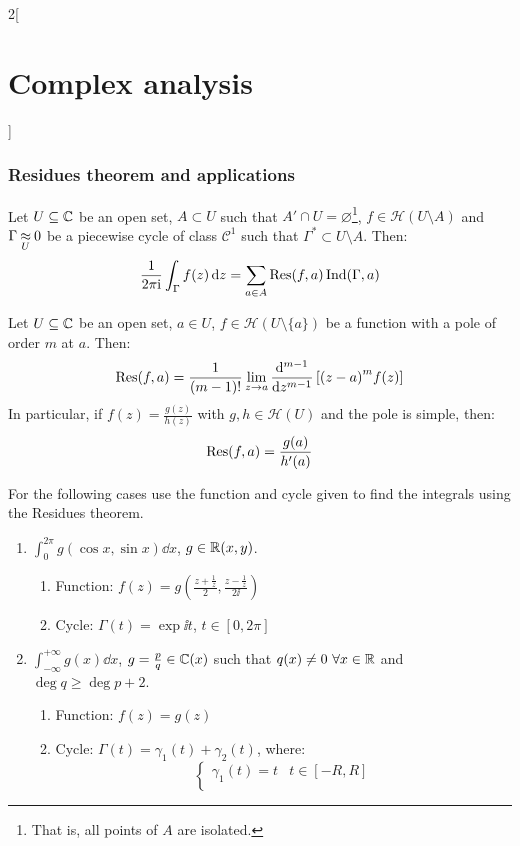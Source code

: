 \documentclass[../../../main.tex]{subfiles}
\begin{document}
\begin{multicols}{2}[\section{Complex analysis}]
  \subsubsection{Residues theorem and applications}
  \begin{theorem}
    Let $U\subseteq \CC$ be an open set, $A\subset U$ such that $A'\cap U=\varnothing$\footnote{That is, all points of $A$ are isolated.}, $f\in\mathcal{H}(U\setminus A)$ and $\Gamma\homoleg{U} 0$ be a piecewise cycle of class $\mathcal{C}^1$ such that $\Gamma^*\subset U\setminus A$. Then:
    $$\frac{1}{2\pi\ii}\int_{\Gamma}f(z)\dd{z}=\sum_{a\in A}\Res(f,a)\Ind(\Gamma,a)$$
  \end{theorem}
  \begin{proposition}
    Let $U\subseteq \CC$ be an open set, $a\in U$, $f\in\mathcal{H}(U\setminus\{a\})$ be a function with a pole of order $m$ at $a$. Then: $$\Res(f,a)=\frac{1}{(m-1)!}\lim_{z\to a}\dv[m-1]{}{z}\left[{(z-a)}^mf(z)\right]$$
    In particular, if $f(z)=\frac{g(z)}{h(z)}$ with $g,h\in\mathcal{H}(U)$ and the pole is simple, then: $$\Res(f,a)=\frac{g(a)}{h'(a)}$$
  \end{proposition}
  \begin{method}
    For the following cases use the function and cycle given to find the integrals using the Residues theorem.
    \begin{enumerate}
      \item $\displaystyle\int_0^{2\pi} g(\cos x,\sin x)\dd{x}$, $g\in\RR(x,y)$.
            \begin{enumerate}
              \item Function: $f(z)=g\left(\frac{z+\frac{1}{z}}{2},\frac{z-\frac{1}{z}}{2\ii}\right)$
              \item Cycle: $\Gamma(t)=\exp{\ii t}$, $t\in[0,2\pi]$
            \end{enumerate}
      \item $\displaystyle\int_{-\infty}^{+\infty} g(x)\dd{x}$, $g=\frac{p}{q}\in\CC(x)$ such that $q(x)\ne 0\ \forall x\in \RR$ and $\deg q\geq \deg p+2$.
            \begin{enumerate}
              \item Function: $f(z)=g(z)$
              \item Cycle: $\Gamma(t)=\gamma_1(t)+\gamma_2(t)$, where:
                    $$
                      \begin{cases}
                        \gamma_1(t)=t            & t\in[-R,R]  \\

\end{cases}$$
\end{enumerate}
\end{enumerate}
\end{method}
\end{multicols}
\end{document}

